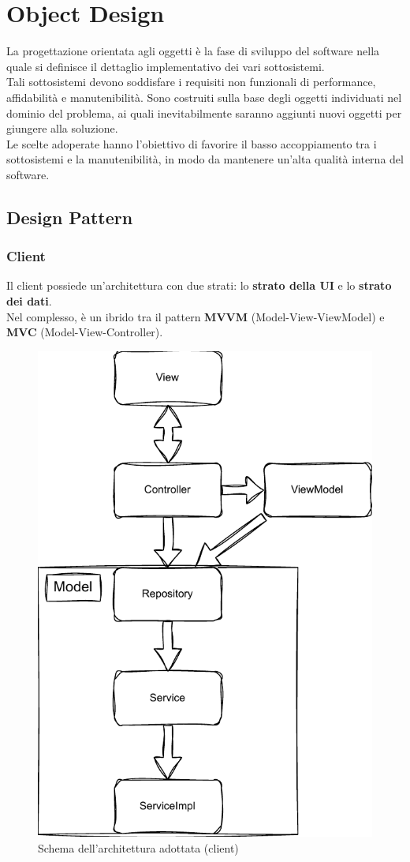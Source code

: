 
\chapter{Object Design}
    La progettazione orientata agli oggetti è la fase di sviluppo del software nella quale si definisce il dettaglio implementativo dei vari sottosistemi. \\
    Tali sottosistemi devono soddisfare i requisiti non funzionali di performance, affidabilità e manutenibilità. Sono costruiti sulla base degli oggetti individuati nel dominio del problema, ai quali inevitabilmente saranno aggiunti nuovi oggetti per giungere alla soluzione. \\
    Le scelte adoperate hanno l'obiettivo di favorire il basso accoppiamento tra i sottosistemi e la manutenibilità, in modo da mantenere un'alta qualità interna del software.

    \section{Design Pattern}
        \subsection{Client}
            Il client possiede un'architettura con due strati: lo \textbf{strato della UI} e lo \textbf{strato dei dati}. \\
            Nel complesso, è un ibrido tra il pattern \textbf{MVVM} (Model-View-ViewModel) e \textbf{MVC} (Model-View-Controller).

            \begin{figure}[htbp!]
                \centering
                \includegraphics[width=0.45\linewidth]{Immagini/Object Design/ArchitetturaClient.pdf}
                \caption{Schema dell'architettura adottata (client)}
            \end{figure}
            
